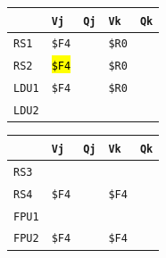 \begin{enumerate}
    \begin{minipage}{0.45\textwidth}
        \centering
        \begin{tabular}{@{} l | l l l l @{}}
            \toprule
                & \texttt{Vj} & \texttt{Qj} & \texttt{Vk} & \texttt{Qk} \\
            \midrule
            \texttt{RS1} & \texttt{\$F4} & & \texttt{\$R0} & \\ [.3em]
            \texttt{RS2} & \hl{\texttt{\$F4}} & & \texttt{\$R0} & \\
            \cmidrule{1-5}
            \texttt{LDU1} & \texttt{\$F4} & & \texttt{\$R0} & \\ [.3em]
            \texttt{LDU2} & & & & \\
            \bottomrule
        \end{tabular}
    \end{minipage}
    \hfill
    \begin{minipage}{0.45\textwidth}
        \centering
        \begin{tabular}{@{} l | l l l l @{}}
            \toprule
            & \texttt{Vj} & \texttt{Qj} & \texttt{Vk} & \texttt{Qk} \\
            \midrule
            \texttt{RS3} & & & & \\ [.3em]
            \texttt{RS4} & \texttt{\$F4} & & \texttt{\$F4} & \\
            \cmidrule{1-5}
            \texttt{FPU1} & & & & \\ [.3em]
            \texttt{FPU2} & \texttt{\$F4} & & \texttt{\$F4} & \\
            \bottomrule
        \end{tabular}
    \end{minipage}


\end{enumerate}
